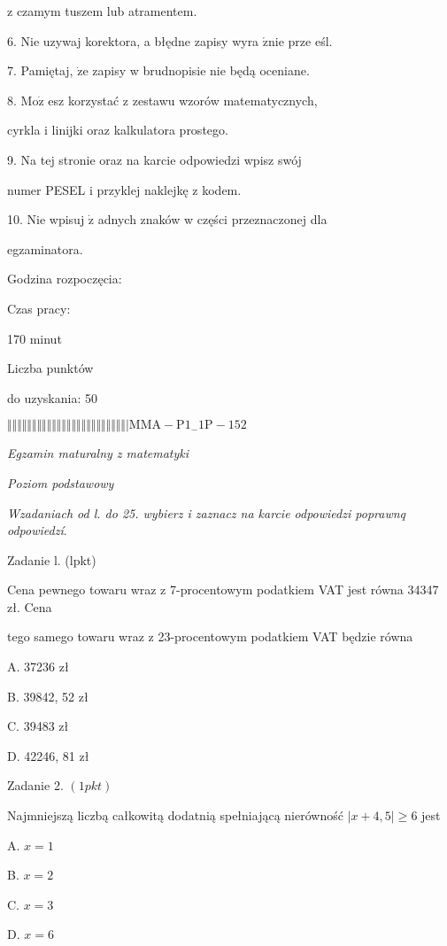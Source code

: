 \documentclass[a4paper,12pt]{article}
\begin{document}
z czamym tuszem lub atramentem.

6. Nie uzywaj korektora, a błędne zapisy wyra $\acute{\mathrm{z}}\mathrm{n}\mathrm{i}\mathrm{e}$ prze eśl.

7. Pamiętaj, $\dot{\mathrm{z}}\mathrm{e}$ zapisy w brudnopisie nie będą oceniane.

8. $\mathrm{M}\mathrm{o}\dot{\mathrm{z}}$ esz korzystać z zestawu wzorów matematycznych,

cyrkla i linijki oraz kalkulatora prostego.

9. Na tej stronie oraz na karcie odpowiedzi wpisz swój

numer PESEL i przyklej naklejkę z kodem.

10. Nie wpisuj $\dot{\mathrm{z}}$ adnych znaków w części przeznaczonej dla

egzaminatora.

Godzina rozpoczęcia:

Czas pracy:

170 minut

Liczba punktów

do uzyskania: 50

$\Vert\Vert\Vert\Vert\Vert\Vert\Vert\Vert\Vert\Vert\Vert\Vert\Vert\Vert\Vert\Vert\Vert\Vert\Vert\Vert\Vert\Vert\Vert\Vert|  \mathrm{M}\mathrm{M}\mathrm{A}-\mathrm{P}1_{-}1\mathrm{P}-152$




{\it Egzamin maturalny z matematyki}

{\it Poziom podstawowy}

{\it Wzadaniach od l. do 25. wybierz i zaznacz na karcie odpowiedzi poprawnq odpowiedzí}.

Zadanie l. (lpkt)

Cena pewnego towaru wraz z 7-procentowym podatkiem VAT jest równa 34347 zł. Cena

tego samego towaru wraz z 23-procentowym podatkiem VAT będzie równa

A. 37236 zł

B. 39842, 52 zł

C. 39483 zł

D. 42246, 81 zł

Zadanie 2. $(1pkt)$

Najmniejszą liczbą całkowitą dodatnią spełniającą nierówność $|x+4,5|\geq 6$ jest

A. $x=1$

B. $x=2$

C. $x=3$

D. $x=6$
\end{document}
